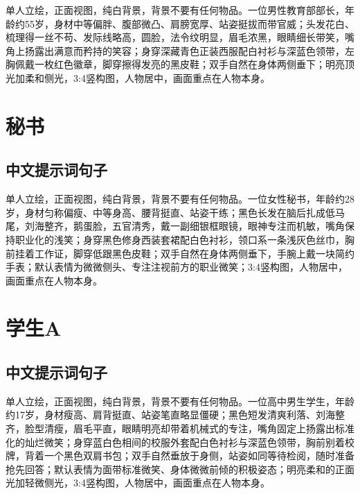 \documentclass[11pt, a4paper]{article}
\begin{document}
	单人立绘，正面视图，纯白背景，背景不要有任何物品。一位男性教育部部长，年龄约55岁，身材中等偏胖、腹部微凸、肩膀宽厚、站姿挺拔而带官威；头发花白、梳理得一丝不苟、发际线略高，圆脸，法令纹明显，眉毛浓黑，眼睛细长带笑，嘴角上扬露出满意而矜持的笑容；身穿深藏青色正装西服配白衬衫与深蓝色领带，左胸佩戴一枚红色徽章，脚穿擦得发亮的黑皮鞋；双手自然在身体两侧垂下；明亮顶光加柔和侧光，3:4竖构图，人物居中，画面重点在人物本身。
	

	

	
	\section{秘书}
	
	\subsection{中文提示词句子}
	
	单人立绘，正面视图，纯白背景，背景不要有任何物品。一位女性秘书，年龄约28岁，身材匀称偏瘦、中等身高、腰背挺直、站姿干练；黑色长发在脑后扎成低马尾，刘海整齐，鹅蛋脸，五官清秀，戴一副细银框眼镜，眼神专注而机敏，嘴角保持职业化的浅笑；身穿黑色修身西装套裙配白色衬衫，领口系一条浅灰色丝巾，胸前挂着工作证，脚穿低跟黑色皮鞋；双手自然在身体两侧垂下，手腕上戴一块简约手表；默认表情为微微侧头、专注注视前方的职业微笑；3:4竖构图，人物居中，画面重点在人物本身。
	

	

	
	\section{学生A}
	
	\subsection{中文提示词句子}
	
	单人立绘，正面视图，纯白背景，背景不要有任何物品。一位高中男生学生，年龄约17岁，身材瘦高、肩背挺直、站姿笔直略显僵硬；黑色短发清爽利落、刘海整齐，脸型清瘦，眉毛平直，眼睛明亮却带着机械式的专注，嘴角固定上扬露出标准化的灿烂微笑；身穿蓝白色相间的校服外套配白色衬衫与深蓝色领带，胸前别着校牌，背着一个黑色双肩书包；双手自然垂放于身侧，站姿如同等待检阅，随时准备抢先回答；默认表情为面带标准微笑、身体微微前倾的积极姿态；明亮柔和的正面光加轻微侧光，3:4竖构图，人物居中，画面重点在人物本身。
	
\end{document}
